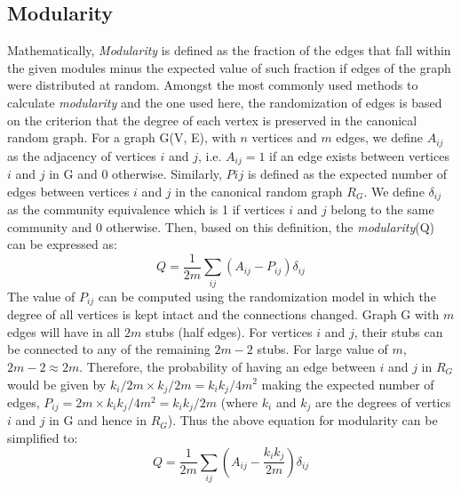 \documentclass[conference]{IEEEtran}
\begin{document}
\subsection{Modularity}
\label{Modularity}
Mathematically, \emph{Modularity} is defined as the fraction of the edges that 
fall within the given modules minus the expected value of such fraction if edges 
of the graph were distributed at random. Amongst the most commonly used methods 
to calculate \emph{modularity} and the one used here, the randomization of edges 
is based on the criterion that the degree of each vertex is preserved in the 
canonical random graph. For a graph G(V, E), with $n$ vertices and $m$ edges, 
we define $A_{ij}$ as the adjacency of vertices $i$ and $j$, i.e. $A_{ij} = 1$ 
if an edge exists between vertices $i$ and $j$ in G and 0 otherwise. Similarly, 
$P{ij}$ is defined as the expected number of edges between vertices $i$ and $j$ 
in the canonical random graph $R_G$. We define $\delta_{ij}$ as the community 
equivalence which is 1 if vertices $i$ and $j$ belong to the same community and 
0 otherwise. Then, based on this definition, the \emph{modularity}(Q) can be 
expressed as:
\begin{equation}
Q = \frac{1}{2m} \sum_{ij} (A_{ij} - P_{ij}) \delta_{ij} 
\end{equation}
The value of $P_{ij}$ can be computed using the randomization model in which
the degree of all vertices is kept intact and the connections changed. Graph G
with $m$ edges will have in all $2m$ stubs (half edges). For vertices $i$ and 
$j$,
their stubs can be connected to any of the remaining $2m - 2$ stubs. For large
value of $m$, $2m - 2 \approx 2m$. Therefore, the probability of having an edge
between $i$ and $j$ in $R_G$ would be given by $k_i/2m \times k_j/2m
= k_ik_j/4m^2$ making the expected number of edges, $P_{ij} = 2m \times
k_ik_j/4m^2 = k_ik_j/2m$ (where $k_i$ and $k_j$ are the degrees of vertics $i$
and $j$ in G and hence in $R_G$). Thus the above equation for
modularity can be simplified to:
\begin{equation}
Q = \frac{1}{2m} \sum_{ij} (A_{ij} - \frac{k_ik_j}{2m}) \delta_{ij}
\end{equation}
\end{document}
